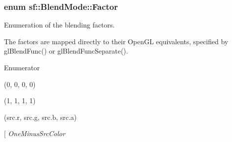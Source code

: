 \hypertarget{structsf_1_1_blend_mode_afb9852caf356b53bb0de460c58a9ebbb}{
\subsubsection[{Factor}]{\setlength{\rightskip}{0pt plus 5cm}enum {\bf sf\-::\-Blend\-Mode\-::\-Factor}}}\label{structsf_1_1_blend_mode_afb9852caf356b53bb0de460c58a9ebbb}


Enumeration of the blending factors. 

The factors are mapped directly to their Open\-G\-L equivalents, specified by gl\-Blend\-Func() or gl\-Blend\-Func\-Separate(). \begin{Desc}
\item[Enumerator]\par
\begin{description}
\item[{\em 
\hypertarget{structsf_1_1_blend_mode_afb9852caf356b53bb0de460c58a9ebbba65485893f4abfbf2ae7702f371e003c1}{Zero}\label{structsf_1_1_blend_mode_afb9852caf356b53bb0de460c58a9ebbba65485893f4abfbf2ae7702f371e003c1}
}](0, 0, 0, 0) \item[{\em 
\hypertarget{structsf_1_1_blend_mode_afb9852caf356b53bb0de460c58a9ebbba45992876072f707d1565f2d08d6b5ed6}{One}\label{structsf_1_1_blend_mode_afb9852caf356b53bb0de460c58a9ebbba45992876072f707d1565f2d08d6b5ed6}
}](1, 1, 1, 1) \item[{\em 
\hypertarget{structsf_1_1_blend_mode_afb9852caf356b53bb0de460c58a9ebbbae3d90dc633cbb883554339e4303f0355}{Src\-Color}\label{structsf_1_1_blend_mode_afb9852caf356b53bb0de460c58a9ebbbae3d90dc633cbb883554339e4303f0355}
}](src.\-r, src.\-g, src.\-b, src.\-a) \item[{\em 
\hypertarget{structsf_1_1_blend_mode_afb9852caf356b53bb0de460c58a9ebbbafc9454075ca0b0613f23c9d7d614dca4}{One\-Minus\-Src\-Color}\label{structsf_1_1_blend_mode_afb9852caf356b53bb0de460c58a9ebbbafc9454075ca0b0613f23c9d7d614dca4}
}
\end{description}
\end{Desc}

